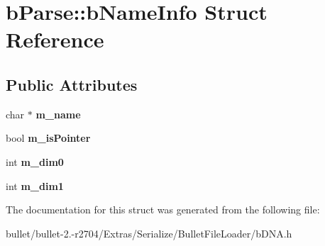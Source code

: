 \hypertarget{structb_parse_1_1b_name_info}{\section{b\+Parse\+:\+:b\+Name\+Info Struct Reference}
\label{structb_parse_1_1b_name_info}
}
\subsection*{Public Attributes}
\begin{DoxyCompactItemize}
\item 
\hypertarget{structb_parse_1_1b_name_info_a2bb553ef3c8466a4379572599fa58ef5}{char $\ast$ {\bfseries m\+\_\+name}}\label{structb_parse_1_1b_name_info_a2bb553ef3c8466a4379572599fa58ef5}

\item 
\hypertarget{structb_parse_1_1b_name_info_a768042550bf1f8318b9f9884fb9fb64d}{bool {\bfseries m\+\_\+is\+Pointer}}\label{structb_parse_1_1b_name_info_a768042550bf1f8318b9f9884fb9fb64d}

\item 
\hypertarget{structb_parse_1_1b_name_info_a8b211801763ee55f2ef2398b2becb97f}{int {\bfseries m\+\_\+dim0}}\label{structb_parse_1_1b_name_info_a8b211801763ee55f2ef2398b2becb97f}

\item 
\hypertarget{structb_parse_1_1b_name_info_a6895abd605ad4cc82e9af115efcaa048}{int {\bfseries m\+\_\+dim1}}\label{structb_parse_1_1b_name_info_a6895abd605ad4cc82e9af115efcaa048}

\end{DoxyCompactItemize}


The documentation for this struct was generated from the following file\+:\begin{DoxyCompactItemize}
\item 
bullet/bullet-\/2.-\/r2704/\+Extras/\+Serialize/\+Bullet\+File\+Loader/b\+D\+N\+A.\+h\end{DoxyCompactItemize}
